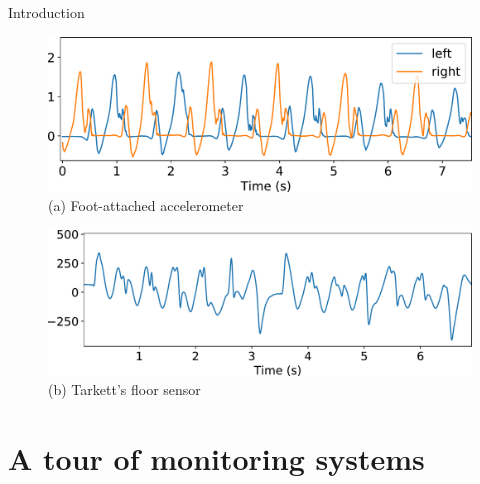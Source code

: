 \documentclass[9pt,t,aspectratio=1610]{beamer}
\newcommand{\ratio}{0.5}
\begin{document}
\begin{frame}{Introduction}{}
\renewcommand{\ratio}{0.4}
\begin{figure}[b]
    \centering
    \begin{minipage}{\linewidth}
        \centering
        \begin{minipage}{\ratio\linewidth}
            \centering
            \includegraphics[width=0.91\linewidth]{signal_marche_accelerometre_left_right_epure.pdf}\\
            {\small (a)\; Foot-attached accelerometer}
        \end{minipage}
        \begin{minipage}{\ratio\linewidth}
            \centering
            \includegraphics[width=\linewidth]{signal_marche_tarkett_epure.pdf}\\
            {\small (b)\; Tarkett's floor sensor}
        \end{minipage}
    \end{minipage}
    \label{fig:introduction_signals_walk}
\end{figure}

\end{frame}

\section{A tour of monitoring systems}
\end{document}
